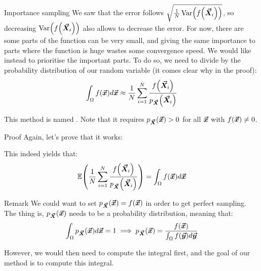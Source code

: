 \documentclass[a4paper]{article}
\begin{document}
\begin{parag}{Importance sampling}
    We saw that the error follows $\sqrt{\frac{1}{N} \Var\left(f\left(\bvec{X}_i\right)\right)}$, so decreasing $\Var\left(f\left(\bvec{X}_i\right)\right)$ also allows to decrease the error. For now, there are some parts of the function can be very small, and giving the same importance to parts where the function is huge wastes some convergence speed. We would like instead to prioritise the important parts. To do so, we need to divide by the probability distribution of our random variable (it comes clear why in the proof):
    \[\int_{\Omega} f\left(\bvec{x}\right) d \bvec{x} \approx \frac{1}{N} \sum_{i=1}^{N} \frac{f\left(\bvec{X}_i\right)}{p_{\bvec{X}}\left(\bvec{X}_i\right)}\]
    
    This method is named . Note that it requires $p_{\bvec{X}}\left(\bvec{x}\right) > 0$ for all $\bm{\protect\vec{x}}$ with $f\left(\bvec{x}\right) \neq 0$.

    \begin{subparag}{Proof}
        Again, let's prove that it works:
        
        This indeed yields that: 
        \[\exval\left(\frac{1}{N} \sum_{i=1}^{N} \frac{f\left(\bvec{X}_i\right)}{p_{\bvec{X}}\left(\bvec{X}_i\right)}\right) = \int_{\Omega} f\left(\bvec{x}\right) d \bvec{x}\]
    \end{subparag}
    

    \begin{subparag}{Remark}
        We could want to set $p_{\bvec{X}}\left(\bvec{x}\right) = f\left(\bvec{x}\right)$ in order to get perfect sampling. The thing is, $p_{\bvec{X}}\left(\bvec{x}\right)$ needs to be a probability distribution, meaning that: 
        \[\int_{\Omega} p_{\bvec{X}}\left(\bvec{x}\right) d \bvec{x} = 1 \implies p_{\bvec{X}}\left(\bvec{x}\right) = \frac{f\left(\bvec{x}\right)}{\int_{\Omega} f\left(\bvec{y}\right) d \bvec{y}}\]
        
        However, we would then need to compute the integral first, and the goal of our method is to compute this integral.
    \end{subparag}
\end{parag}
\end{document}
